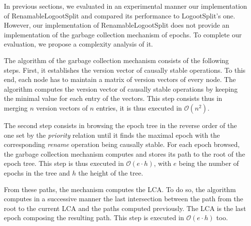 \documentclass[10pt,journal,compsoc]{IEEEtran}
\newcommand{\bigO}[1]{$\mathcal{O}(#1)$}
\begin{document}
In previous sections, we evaluated in an experimental manner our implementation of RenamableLogootSplit and compared its performance to LogootSplit's one.
However, our implementation of RenamableLogootSplit does not provide an implementation of the garbage collection mechanism of epochs.
To complete our evaluation, we propose a complexity analysis of it.

The algorithm of the garbage collection mechanism consists of the following steps.
First, it establishes the version vector of causally stable operations.
To this end, each node has to maintain a matrix of version vectors of every node.
The algorithm computes the version vector of causally stable operations by keeping the minimal value for each entry of the vectors.
This step consists thus in merging $n$ version vectors of $n$ entries, it is thus executed in \bigO{n^2}.

The second step consists in browsing the epoch tree in the reverse order of the one set by the \emph{priority} relation until it finds the maximal epoch with the corresponding \emph{rename} operation being causally stable.
For each epoch browsed, the garbage collection mechanism computes and stores its path to the root of the epoch tree.
This step is thus executed in \bigO{e \cdot h}, with $e$ being the number of epochs in the tree and $h$ the height of the tree.

From these paths, the mechanism computes the \ac{LCA}.
To do so, the algorithm computes in a successive manner the last intersection between the path from the root to the current \ac{LCA} and the paths computed previously.
The \ac{LCA} is the last epoch composing the resulting path.
This step is executed in \bigO{e \cdot h} too.
\end{document}
